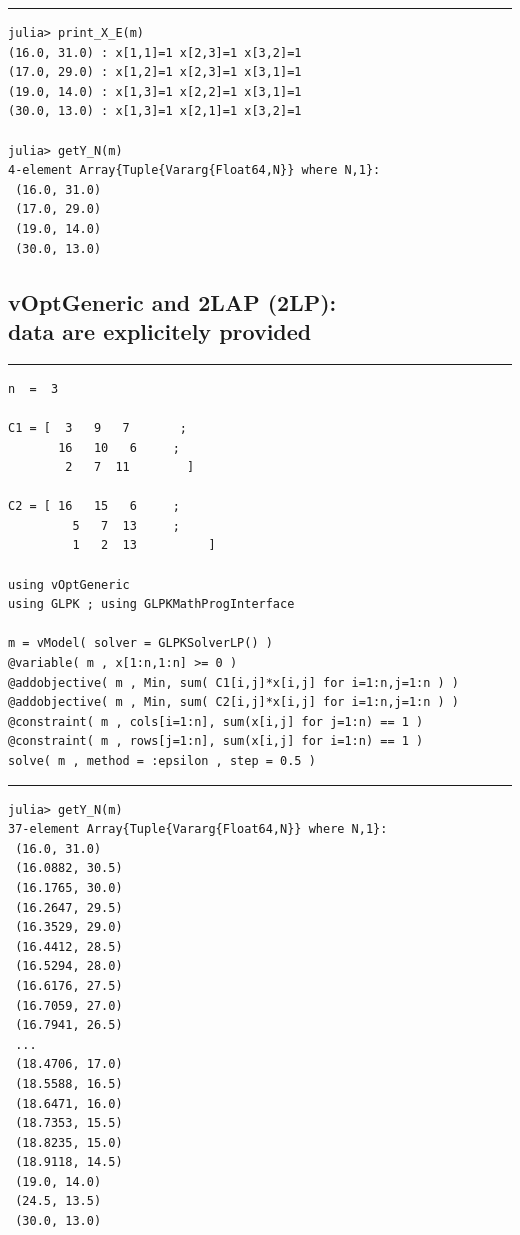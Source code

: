 \documentclass[11pt]{article}
\begin{document}
\vspace{5mm}  \vspace{2mm} \hrule

\begin{verbatim}
julia> print_X_E(m)
(16.0, 31.0) : x[1,1]=1 x[2,3]=1 x[3,2]=1 
(17.0, 29.0) : x[1,2]=1 x[2,3]=1 x[3,1]=1 
(19.0, 14.0) : x[1,3]=1 x[2,2]=1 x[3,1]=1 
(30.0, 13.0) : x[1,3]=1 x[2,1]=1 x[3,2]=1

julia> getY_N(m)
4-element Array{Tuple{Vararg{Float64,N}} where N,1}:
 (16.0, 31.0)
 (17.0, 29.0)
 (19.0, 14.0)
 (30.0, 13.0)
\end{verbatim}
\break
%
%
\subsection{vOptGeneric and 2LAP (2LP):\\ data are explicitely provided}

\vspace{5mm}  \vspace{2mm} \hrule

{%
\begin{lstlisting}
n  =  3

C1 = [  3   9   7       ;
       16   10   6     ;
        2   7  11        ]

C2 = [ 16   15   6     ;
         5   7  13     ;
         1   2  13          ]
       
using vOptGeneric
using GLPK ; using GLPKMathProgInterface

m = vModel( solver = GLPKSolverLP() )
@variable( m , x[1:n,1:n] >= 0 )
@addobjective( m , Min, sum( C1[i,j]*x[i,j] for i=1:n,j=1:n ) )
@addobjective( m , Min, sum( C2[i,j]*x[i,j] for i=1:n,j=1:n ) )
@constraint( m , cols[i=1:n], sum(x[i,j] for j=1:n) == 1 )
@constraint( m , rows[j=1:n], sum(x[i,j] for i=1:n) == 1 )
solve( m , method = :epsilon , step = 0.5 )
\end{lstlisting}
}

\vspace{5mm}  \vspace{2mm} \hrule

\begin{verbatim}
julia> getY_N(m)
37-element Array{Tuple{Vararg{Float64,N}} where N,1}:
 (16.0, 31.0)   
 (16.0882, 30.5)
 (16.1765, 30.0)
 (16.2647, 29.5)
 (16.3529, 29.0)
 (16.4412, 28.5)
 (16.5294, 28.0)
 (16.6176, 27.5)
 (16.7059, 27.0)
 (16.7941, 26.5)
 ...              
 (18.4706, 17.0)
 (18.5588, 16.5)
 (18.6471, 16.0)
 (18.7353, 15.5)
 (18.8235, 15.0)
 (18.9118, 14.5)
 (19.0, 14.0)   
 (24.5, 13.5)   
 (30.0, 13.0) 
\end{verbatim}
\break
\end{document}
